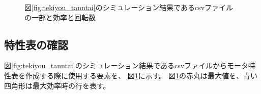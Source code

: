 \begin{figure}[t]
	\centering
	\caption{図\ref{fig:tekiyou_tanntai}のシミュレーション結果であるcsvファイルの一部と効率と回転数}
	\label{fig:tekiyou_csv_wakariyasui}
\end{figure}

\clearpage

\subsection{特性表の確認}
図\ref{fig:tekiyou_tanntai}のシミュレーション結果であるcsvファイルからモータ特性表を作成する際に使用する要素を、
図\ref{fig:tekiyou_csv_wakariyasui}に示す。
図\ref{fig:tekiyou_csv_wakariyasui}の赤丸は最大値を、青い四角形は最大効率時の行を表す。

